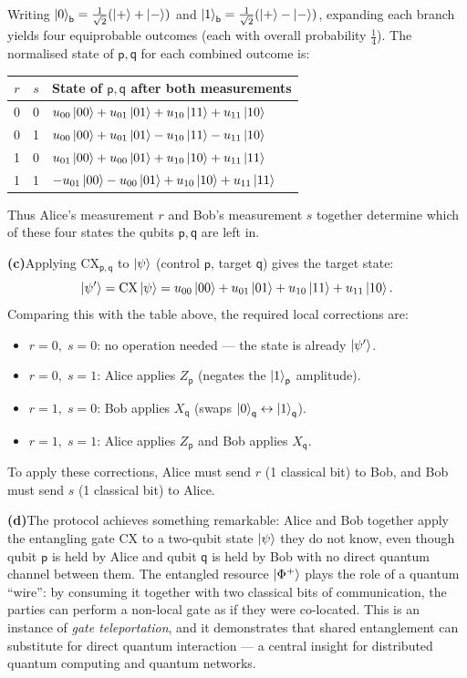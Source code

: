 \documentclass[12pt,a4paper]{article}
\begin{document}
Writing $\ket{0}_{\mathsf{b}}=\tfrac{1}{\sqrt{2}}(\ket{+}+\ket{-})$ and
$\ket{1}_{\mathsf{b}}=\tfrac{1}{\sqrt{2}}(\ket{+}-\ket{-})$,
expanding each branch yields four equiprobable outcomes (each with overall probability $\tfrac{1}{4}$).
The normalised state of $\mathsf{p,q}$ for each combined outcome is:

\begin{center}
\begin{tabular}{ccl}
\hline
$r$ & $s$ & State of $\mathsf{p,q}$ after both measurements \\
\hline
0 & 0 & $u_{00}\ket{00}+u_{01}\ket{01}+u_{10}\ket{11}+u_{11}\ket{10}$ \\
0 & 1 & $u_{00}\ket{00}+u_{01}\ket{01}-u_{10}\ket{11}-u_{11}\ket{10}$ \\
1 & 0 & $u_{01}\ket{00}+u_{00}\ket{01}+u_{10}\ket{10}+u_{11}\ket{11}$ \\
1 & 1 & $-u_{01}\ket{00}-u_{00}\ket{01}+u_{10}\ket{10}+u_{11}\ket{11}$ \\
\hline
\end{tabular}
\end{center}

Thus Alice's measurement $r$ and Bob's measurement $s$ together determine which of these four states the qubits $\mathsf{p,q}$ are left in.

\medskip
\noindent\textbf{(c)}\enspace Applying $\mathrm{CX}_{\mathsf{p,q}}$ to $\ket{\psi}$ (control $\mathsf{p}$, target $\mathsf{q}$) gives the target state:
\[
  \ket{\psi'} = \mathrm{CX}\ket{\psi}
  = u_{00}\ket{00}+u_{01}\ket{01}+u_{10}\ket{11}+u_{11}\ket{10}.
\]
Comparing this with the table above, the required local corrections are:
\begin{itemize}
  \item $r=0,\;s=0$: no operation needed — the state is already $\ket{\psi'}$.
  \item $r=0,\;s=1$: Alice applies $Z_{\mathsf{p}}$ (negates the $\ket{1}_{\mathsf{p}}$ amplitude).
  \item $r=1,\;s=0$: Bob applies $X_{\mathsf{q}}$ (swaps $\ket{0}_{\mathsf{q}}\leftrightarrow\ket{1}_{\mathsf{q}}$).
  \item $r=1,\;s=1$: Alice applies $Z_{\mathsf{p}}$ and Bob applies $X_{\mathsf{q}}$.
\end{itemize}
To apply these corrections, Alice must send $r$ (1 classical bit) to Bob,
and Bob must send $s$ (1 classical bit) to Alice.

\medskip
\noindent\textbf{(d)}\enspace The protocol achieves something remarkable: Alice and Bob together apply the entangling gate
$\mathrm{CX}$ to a two-qubit state $\ket{\psi}$ they do not know, even though qubit $\mathsf{p}$ is
held by Alice and qubit $\mathsf{q}$ is held by Bob with no direct quantum channel between them.
The entangled resource $\ket{\Phi^+}$ plays the role of a quantum ``wire'': by consuming it together
with two classical bits of communication, the parties can perform a non-local gate as if they were
co-located. This is an instance of \emph{gate teleportation}, and it demonstrates that shared
entanglement can substitute for direct quantum interaction — a central insight for distributed
quantum computing and quantum networks.
\end{document}
